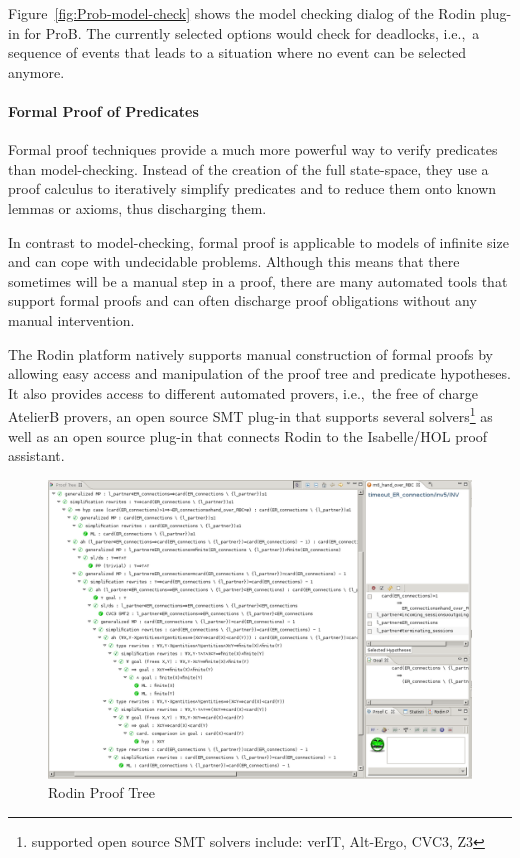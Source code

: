 Figure~\ref{fig:Prob-model-check} shows the model checking dialog of the Rodin
plug-in for ProB. The currently selected options would check for deadlocks,
i.e.,\ a sequence of events that leads to a situation where no event can be
selected anymore.


\paragraph{Formal Proof of Predicates}
\label{sec:form-proof-pred}

Formal proof techniques provide a much more powerful way to verify predicates
than model-checking. Instead of the creation of the full state-space, they use a
proof calculus to iteratively simplify predicates and to reduce them onto known
lemmas or axioms, thus discharging them.

In contrast to model-checking, formal proof is applicable to models of infinite
size and can cope with undecidable problems. Although this means that there
sometimes will be a manual step in a proof, there are many automated tools that
support formal proofs and can often discharge proof obligations without any
manual intervention.

The Rodin platform natively supports manual construction of formal proofs by
allowing easy access and manipulation of the proof tree and predicate
hypotheses. It also provides access to different automated provers, i.e.,\ the
free of charge AtelierB provers, an open source SMT plug-in that supports
several solvers\footnote{supported open source SMT solvers include: verIT,
  Alt-Ergo, CVC3, Z3} as well as an open source plug-in that connects Rodin to
the Isabelle/HOL proof assistant.

\begin{figure}[ht]
  \centering
  \includegraphics[width=1\textwidth]{figures/ProofTree}
  \caption{Rodin Proof Tree}
  \label{fig:proof-tree}
\end{figure}

